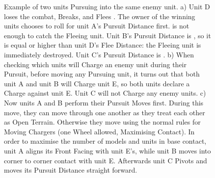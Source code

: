 \begin{figure}[!htbp]
	\renewcommand{\figbiglettersize}{20}
	\begin{minipage}{0.55\textwidth}
	\def\svgwidth{\textwidth}
	
	\end{minipage}\hfill\begin{minipage}{0.43\textwidth}
	\caption{Example of two units Pursuing into the same enemy unit.\captionpar
	a) Unit D loses the combat, Breaks, and Flees . The owner of the winning units chooses to roll for unit A's Pursuit Distance first.  is not enough to catch the Fleeing unit. Unit B's Pursuit Distance is , so it is equal or higher than unit D's Flee Distance: the Fleeing unit is immediately destroyed. Unit C's Pursuit Distance is .\vspace*{4.5cm}\captionpar
	b) When checking which units will Charge an enemy unit during their Pursuit, before moving any Pursuing unit, it turns out that both unit A and unit B will Charge unit E, so both units declare a Charge against unit E. Unit C will not Charge any enemy units.\vspace*{3.3cm}\captionpar
	c) Now units A and B perform their Pursuit Moves first. During this move, they can move through one another as they treat each other as Open Terrain. Otherwise they move using the normal rules for Moving Chargers (one Wheel allowed, Maximising Contact). In order to maximise the number of models and units in base contact, unit A aligns its Front Facing with unit E's, while unit B moves into corner to corner contact with unit E. Afterwards unit C Pivots and moves its Pursuit Distance straight forward.}
	\label{figure/two_units_pursuit}
	\end{minipage}
\end{figure}

\newcommand{\figPursA}{a)}
\newcommand{\figPursB}{b)}
\newcommand{\figPursC}{c)}
\newcommand{\figPursD}{d)}
\newcommand{\figPursTextA}{\begin{minipage}{0.45\unitlength}\begin{center}\normalfontsize{The Front Facing of the Pursuing unit touches a friendly Unit Boundary.}\end{center}\end{minipage}}
\newcommand{\figPursTextB}{\begin{minipage}{0.45\unitlength}\begin{center}\normalfontsize{The Front Facing of the Pursuing unit touches an enemy Unit Boundary.}\end{center}\end{minipage}}
\newcommand{\figPursTextC}{\begin{minipage}[b]{0.4\unitlength}\normalfontsize{The first obstacle would be an enemy unit.}\end{minipage}}
\newcommand{\figPursTextD}{\begin{minipage}[b]{0.4\unitlength}\normalfontsize{The first obstacle would be an obstruction.}\end{minipage}}

